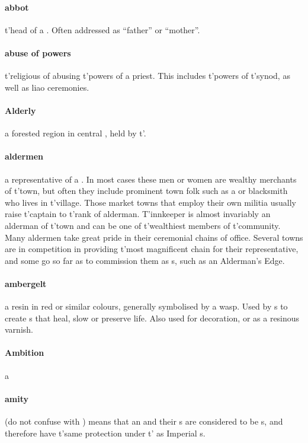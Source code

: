 \paragraph{abbot} t'\allowbreak head  of a . Often addressed as “father” or “mother”. 
\paragraph{abuse of powers}t'religious  of abusing t'\allowbreak powers of a priest. This includes t'\allowbreak powers of t'\allowbreak synod, as well as liao ceremonies.
\paragraph{Alderly} a forested region in central , held by t'\allowbreak {}.
\paragraph{aldermen} a representative of a . In most cases these men or women are wealthy merchants of t'\allowbreak town, but often they include prominent town folk such as a  or blacksmith who lives in t'\allowbreak village. Those market towns that employ their own militia usually raise t'\allowbreak captain to t'\allowbreak rank of alderman. T'\allowbreak innkeeper is almost invariably an alderman of t'\allowbreak town and can be one of t'\allowbreak wealthiest members of t'\allowbreak community. Many aldermen take great pride in their ceremonial chains of office. Several towns are in competition in providing t'\allowbreak most magnificent chain for their representative, and some go so far as to commission them as s, such as an Alderman's Edge. 
\paragraph{ambergelt} a resin in red or similar colours, generally symbolised by a wasp. Used by s to create s that heal, slow or preserve life. Also used for decoration, or as a resinous varnish.
\paragraph{Ambition} a  
\paragraph{amity} (do not confuse with ) means that an  and their s are considered to be s, and therefore have t'\allowbreak same protection under t'\allowbreak {} as Imperial s.
